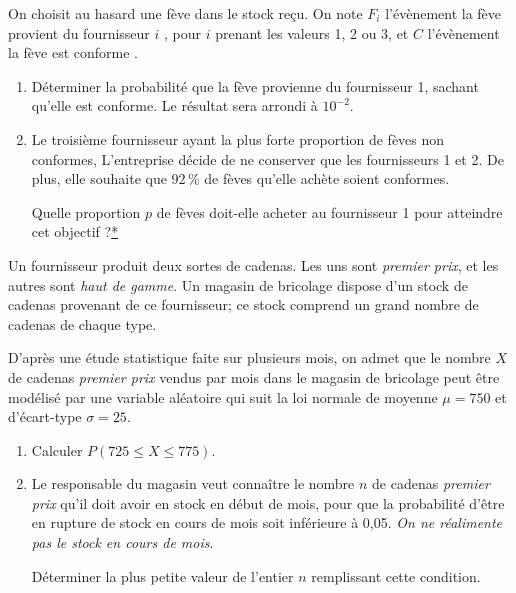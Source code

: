 \documentclass[12pt,french]{article}
\begin{document}
\begin{question}[subtitle={Amérique du Nord 2015}]
On choisit au hasard une fève dans le stock reçu. On note $F_i$ l'évènement \og la fève provient du fournisseur $i$ \fg, pour $i$ prenant les valeurs 1, 2 ou 3, et $C$ l'évènement \og la fève est conforme \fg. 

\medskip

\begin{enumerate}
\item Déterminer la probabilité que la fève provienne du fournisseur 1, sachant qu'elle est conforme. Le résultat sera arrondi à $10^{-2}$. 
\item Le troisième fournisseur ayant la plus forte proportion de fèves non conformes, L’entreprise décide de ne conserver que les fournisseurs 1 et 2. De plus, elle souhaite que 92\,\% de fèves qu'elle achète soient conformes. 

Quelle proportion $p$ de fèves doit-elle acheter au fournisseur 1 pour atteindre cet objectif ?\hyperlink{Index}{*} 
\end{enumerate}

\end{question}

\begin{question}[subtitle={Centres étrangers 2015}]
Un fournisseur produit deux sortes de cadenas. Les uns sont \emph{premier prix}, et les autres sont \emph{haut de gamme}. Un magasin de bricolage dispose d'un stock de cadenas provenant de ce fournisseur; ce
stock comprend un grand nombre de cadenas de chaque type.

D'après une étude statistique faite sur plusieurs mois, on admet que le nombre $X$ de cadenas
\emph{premier prix} vendus par mois dans le magasin de bricolage peut être modélisé par une variable aléatoire qui suit la loi normale de moyenne $\mu = 750$ et d'écart-type $\sigma = 25$.

\medskip

\begin{enumerate}
\item Calculer $P(725 \leqslant  X \leqslant 775)$.
\item Le responsable du magasin veut connaître le nombre $n$ de cadenas \emph{premier prix} qu'il doit avoir en stock en début de mois, pour que la probabilité d'être en rupture de stock en cours de mois soit inférieure à 0,05. \emph{On ne réalimente pas le stock en cours de mois}.

\medskip

Déterminer la plus petite valeur de l'entier $n$ remplissant cette condition.
\end{enumerate}

\end{question}
\end{document}

